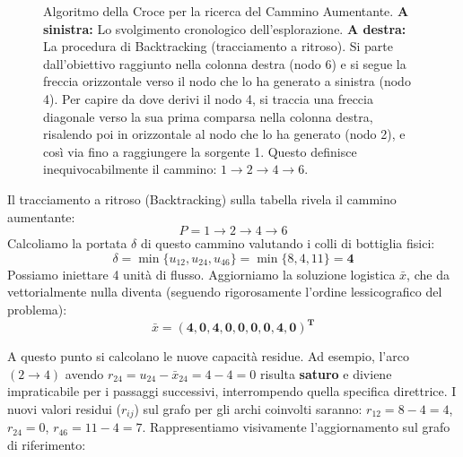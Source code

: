 \documentclass[12pt, a4paper]{article}
\begin{document}
\begin{figure}[H]
\begin{minipage}{0.45\textwidth}
			\caption*{Tabella 2: Backtracking}
		\end{minipage}
		\caption{Algoritmo della Croce per la ricerca del Cammino Aumentante. \textbf{A sinistra:} Lo svolgimento cronologico dell'esplorazione. \textbf{A destra:} La procedura di Backtracking (tracciamento a ritroso). Si parte dall'obiettivo raggiunto nella colonna destra (nodo 6) e si segue la freccia orizzontale verso il nodo che lo ha generato a sinistra (nodo 4). Per capire da dove derivi il nodo 4, si traccia una freccia diagonale verso la sua prima comparsa nella colonna destra, risalendo poi in orizzontale al nodo che lo ha generato (nodo 2), e così via fino a raggiungere la sorgente 1. Questo definisce inequivocabilmente il cammino: $1 \to 2 \to 4 \to 6$.}
	\end{figure}
	
	Il tracciamento a ritroso (Backtracking) sulla tabella rivela il cammino aumentante:
	\[ P = 1 \to 2 \to 4 \to 6 \]
	Calcoliamo la portata $\delta$ di questo cammino valutando i colli di bottiglia fisici:
	\[ \delta = \min \{ u_{12}, u_{24}, u_{46} \} = \min \{ 8, 4, 11 \} = \mathbf{4} \]
	Possiamo iniettare 4 unità di flusso. Aggiorniamo la soluzione logistica $\bar{x}$, che da vettorialmente nulla diventa (seguendo rigorosamente l'ordine lessicografico del problema):
	\[ \bar{x} = \mathbf{(4, 0, 4, 0, 0, 0, 0, 4, 0)^T} \]
	
	A questo punto si calcolano le nuove capacità residue. Ad esempio, l'arco $(2\to4)$ avendo $r_{24} = u_{24} - \bar{x}_{24} = 4 - 4 = 0$ risulta \textbf{saturo} e diviene impraticabile per i passaggi successivi, interrompendo quella specifica direttrice. 
	I nuovi valori residui ($r_{ij}$) sul grafo per gli archi coinvolti saranno: $r_{12} = 8 - 4 = 4$, $r_{24} = 0$, $r_{46} = 11 - 4 = 7$.
	Rappresentiamo visivamente l'aggiornamento sul grafo di riferimento:
	
\end{document}
